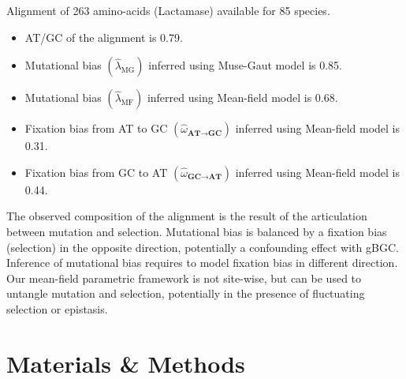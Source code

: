 Alignment of 263 amino-acids (Lactamase) available for 85 species.
\begin{itemize}
	\item AT/GC of the alignment is 0.79.
	\item Mutational bias $\left({\widehat{\lambda}_{\text{MG}}} \right)$ inferred using Muse-Gaut model is 0.85.
	\item Mutational bias $\left({\widehat{\lambda}_{\text{MF}}} \right)$ inferred using Mean-field model is 0.68.
	\item Fixation bias from AT to GC $\left(\widehat{\omega}_{\textbf{AT} \rightarrow \textbf{GC}}\right)$ inferred using Mean-field model is 0.31.
	\item Fixation bias from GC to AT $\left(\widehat{\omega}_{\textbf{GC} \rightarrow \textbf{AT}}\right)$ inferred using Mean-field model is 0.44.
\end{itemize}

The observed composition of the alignment is the result of the articulation between mutation and selection.
Mutational bias is balanced by a fixation bias (selection) in the opposite direction, potentially a confounding effect with gBGC.
Inference of mutational bias requires to model fixation bias in different direction.
Our mean-field parametric framework is not site-wise, but can be used to untangle mutation and selection, potentially in the presence of fluctuating selection or epistasis.

\section{Materials \& Methods}

